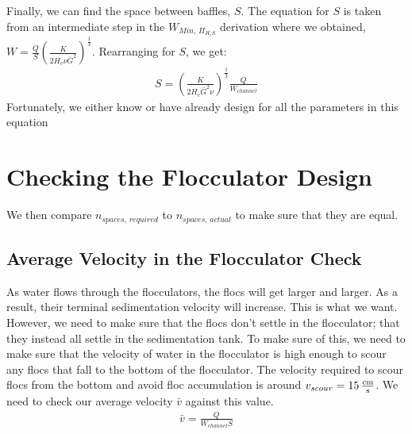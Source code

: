 \documentclass[letterpaper,10pt,english]{sphinxmanual}
\begin{document}
\subsubsection{}
\label{\detokenize{Flocculation/Floc_Design:baffle-spacing-math-s}}
Finally, we can find the space between baffles, \(S\). The equation for \(S\) is taken from an intermediate step in the \(W_{Min, \, \Pi_{H_eS}}\) derivation where we obtained, \(W = \frac{Q}{S}\left( \frac{K}{2 H_e \nu \bar G^2} \right)^\frac{1}{3}\). Rearranging for \(S\), we get:
\begin{equation}\label{equation:Flocculation/Floc_Design:Flocculation/Floc_Design:29}
\begin{split}S = \left( \frac{K}{2 H_e \bar G^2 \nu } \right)^\frac{1}{3} \frac{Q}{W_{channel}}\end{split}
\end{equation}
Fortunately, we either know or have already design for all the parameters in this equation


\section{Checking the Flocculator Design}
\label{\detokenize{Flocculation/Floc_Design:checking-the-flocculator-design}}
We then compare \(n_{spaces, \, required}\) to \(n_{spaces, \, actual}\) to make sure that they are equal.


\subsection{Average Velocity in the Flocculator Check}
\label{\detokenize{Flocculation/Floc_Design:average-velocity-in-the-flocculator-check}}
As water flows through the flocculators, the flocs will get larger and larger. As a result, their terminal sedimentation velocity will increase. This is what we want. However, we need to make sure that the flocs don’t settle in the flocculator; that they instead all settle in the sedimentation tank. To make sure of this, we need to make sure that the velocity of water in the flocculator is high enough to scour any flocs that fall to the bottom of the flocculator. The velocity required to scour flocs from the bottom and avoid floc accumulation is around \(v_{scour} = 15 \, {\rm \frac{cm}{s}}\). We need to check our average velocity \(\bar v\) against this value.
\begin{equation}\label{equation:Flocculation/Floc_Design:Flocculation/Floc_Design:30}
\begin{split}\bar v = \frac{Q}{W_{channel} S}\end{split}
\end{equation}
\end{document}
